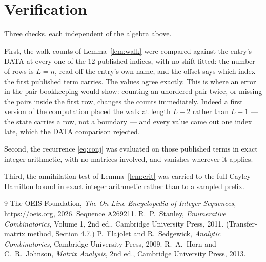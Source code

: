 \documentclass[11pt,a4paper]{article}
\theoremstyle{plain}
\theoremstyle{definition}
\begin{document}
\section{Verification}

Three checks, each independent of the algebra above.

First, the walk counts of Lemma~\ref{lem:walk} were compared against the entry's DATA at
every one of the $12$ published indices, with no shift fitted: the number of rows is
$L=n$, read off the entry's own name, and the offset says which index the first
published term carries. The values agree exactly. This is where an error in the pair
bookkeeping would show: counting an unordered pair twice, or missing the pairs inside the
first row, changes the counts immediately. Indeed a first version of the computation
placed the walk at length $L-2$ rather than $L-1$ --- the state carries a row, not a
boundary --- and every value came out one index late, which the DATA comparison rejected.

Second, the recurrence \eqref{eq:conj} was evaluated on those published terms in exact
integer arithmetic, with no matrices involved, and vanishes wherever it applies.

Third, the annihilation test of Lemma~\ref{lem:crit} was carried to the full
Cayley--Hamilton bound in exact integer arithmetic rather than to a sampled prefix.

\begin{thebibliography}{9}
 The OEIS Foundation, \emph{The On-Line Encyclopedia of Integer
Sequences}, \url{https://oeis.org}, 2026. Sequence A269211.
 R.~P.~Stanley, \emph{Enumerative Combinatorics}, Volume 1, 2nd ed.,
Cambridge University Press, 2011. (Transfer-matrix method, Section 4.7.)
 P.~Flajolet and R.~Sedgewick, \emph{Analytic Combinatorics}, Cambridge
University Press, 2009.
 R.~A.~Horn and C.~R.~Johnson, \emph{Matrix Analysis}, 2nd ed., Cambridge
University Press, 2013.
\end{thebibliography}
\end{document}
